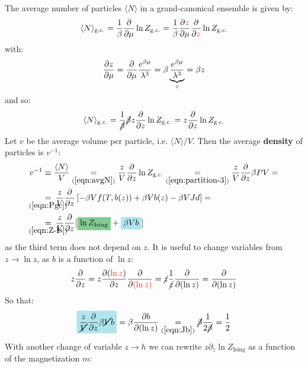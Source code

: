 \documentclass[../template.tex]{subfiles}
\begin{document}
The average number of particles $\langle N \rangle$ in a grand-canonical ensemble is given by:
\begin{align} 
    \langle N \rangle_{\mathrm{g.c.}} = \frac{1}{\beta} \pdv{\mu} \ln Z_{\mathrm{g.c.}} = \frac{1}{\beta} \pdv{\textcolor{Red}{z}}{\mu} \pdv{\textcolor{Red}{z}} \ln Z_{\mathrm{g.c.}}
\end{align}
with:
\begin{align*}
    \pdv{z}{\mu} = \pdv{\mu} \frac{e^{\beta \mu}}{\lambda^3} = \beta \underbrace{\frac{e^{\beta \mu}}{\lambda^3}}_{z} = \beta z 
\end{align*}
and so:
\begin{align}\label{eqn:avgN}
    \langle N \rangle_{\mathrm{g.c.}} = \frac{1}{\cancel{\beta}} \cancel{\beta} z \pdv{z} \ln Z_{\mathrm{g.c.}} = z \pdv{z} \ln Z_{\mathrm{g.c.}}
\end{align}
Let $v$ be the average volume per particle, i.e. $\langle N \rangle/V$. Then the average \textbf{density} of particles is $v^{-1}$:
\begin{align}\nonumber
    v^{-1} &\equiv \frac{\langle N \rangle}{V} \underset{(\ref{eqn:avgN})}{=}  \frac{z}{V}  \pdv{z} \ln Z_{\mathrm{g.c.}} \underset{(\ref{eqn:partition-3})}{=} \frac{z}{V} \pdv{z} \beta P V =\\ \nonumber
    &\underset{\mathclap{(\ref{eqn:Pgc})}}{=}\>  \frac{z}{V} \pdv{z} \left[-\beta V f(T,b(z)) +\beta V b(z)  - \beta V J d\right] =\\
    &\underset{\mathclap{(\ref{eqn:Z-Is})}}{=} \> \frac{z}{V} \pdv{z} [\hlc{ForestGreen}{\ln Z_{\mathrm{Ising}}} + \hlc{SkyBlue}{\beta V b}] \label{eqn:v-1}
\end{align}
as the third term does not depend on $z$. It is useful to change variables from $z \to \ln z$, as $b$ is a function of $\ln z$:
\begin{align*}
    z\pdv{z} = z \pdv{(\textcolor{Red}{\ln z})}{z} \pdv{\textcolor{Red}{(\ln z)}} = \cancel{z} \frac{1}{\cancel{z}} \pdv{(\ln z)} = \pdv{(\ln z)} 
\end{align*}
So that:
\begin{align}\label{eqn:dv1}
    \hlc{SkyBlue}{\frac{z}{\cancel{V}} \pdv{z} \beta \cancel{V} b} = \beta  \pdv{b}{(\ln z)} \underset{(\ref{eqn:Jb})}{=}  \cancel{\beta } \frac{1}{2\cancel{ \beta }} = \frac{1}{2} 
\end{align}
With another change of variable $z \to h$ we can rewrite $z \partial_z \ln Z_{\mathrm{Ising}}$ as a function of the magnetization $m$:
\end{document}
